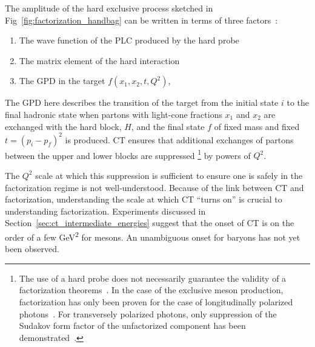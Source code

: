 The amplitude of the hard exclusive process sketched in
Fig~\ref{fig:factorization_handbag} can be written in terms of three
factors~\cite{Dutta_2012}:
\begin{enumerate}
    \item  The wave function of the PLC produced by the hard probe
    \item  The matrix element of the hard interaction
    \item  The GPD in the target $f(x_1,x_2,t,Q^2)$,
\end{enumerate}

The GPD here describes the transition of the target from the initial state $i$
to the final hadronic state when partons with light-cone fractions $x_1$ and
$x_2$ are exchanged with the hard block, $H$, and the final state $f$ of fixed
mass and fixed $t=(p_i-p_f)^2$ is produced.
CT ensures that additional exchanges of partons between the
upper and lower blocks are
suppressed
\footnote{
The use of a hard probe does not necessarily guarantee the validity of a
factorization theorems~\cite{Dutta_2012}.
In the case of the exclusive meson production, factorization has only been
proven for the case of longitudinally polarized photons~\cite{Collins_1997}.
For transversely polarized photons, only suppression of the Sudakov form
factor of the unfactorized component has been
demonstrated~\cite{Mankiewicz_2000}.}
by powers of $Q^2$.


The $Q^2$ scale at which this suppression is sufficient to ensure one is
safely in the factorization regime is not well-understood.
Because of the link between CT and factorization, understanding the scale at
which CT ``turns on'' is crucial to understanding factorization.
Experiments discussed in Section~\ref{sec:ct_intermediate_energies} suggest
that the onset of CT is on the order of a few \si{\giga\electronvolt\squared}
for mesons.
An unambiguous onset for baryons has not yet been observed.

